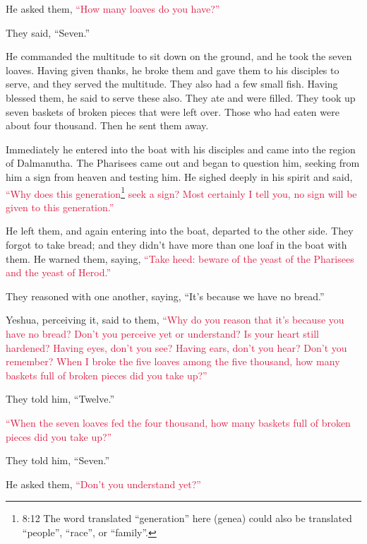 \myverse{}He asked them,
\textcolor{crimson}{“How many loaves do you have?”}

They said, “Seven.”

\myverse{}He commanded the multitude to sit down on the ground, and he took
the seven loaves. Having given thanks, he broke them and gave them to his disciples to serve, and they
served the multitude.
\myverse{}They also had a few small fish. Having blessed them, he said to serve these
also.
\myverse{}They ate and were filled. They took up seven baskets of broken pieces that were
left over.
\myverse{}Those who had eaten were about four thousand. Then he sent them away.

\myverse{}Immediately he entered into the boat with his disciples and came
into the region of Dalmanutha.
\myverse{}The Pharisees came out and began to question him, seeking from him a sign
from heaven and testing him.
\myverse{}He sighed deeply in his spirit and said,
\textcolor{crimson}{“Why does this generation}\footnote{8:12 The word translated “generation” here (genea) could also be translated “people”, “race”, or “family”.}
\textcolor{crimson}{seek a sign? Most certainly I tell you, no sign will be given to this generation.”}

\myverse{}He left them, and again entering into the boat, departed to the
other side.
\myverse{}They forgot to take bread; and they didn’t have more than one loaf in the
boat with them.
\myverse{}He warned them, saying,
\textcolor{crimson}{“Take heed: beware of the yeast of the Pharisees and the yeast of Herod.”}

\myverse{}They reasoned with one another, saying, “It’s because we have
no bread.”

\myverse{}Yeshua, perceiving it, said to them,
\textcolor{crimson}{“Why do you reason that it’s because you have no bread? Don’t you perceive yet or understand? Is your
	heart still hardened?
}
\myverse{}\textcolor{crimson}{Having eyes, don’t you see? Having ears, don’t you hear? Don’t you remember?
}
\myverse{}\textcolor{crimson}{When I broke the five loaves among the five thousand, how many baskets
	full of broken pieces did you take up?”}

They told him, “Twelve.”

\myverse{}\textcolor{crimson}{“When the seven loaves fed the four thousand, how many baskets
	full of broken pieces did you take up?”}

They told him, “Seven.”

\myverse{}He asked them,
\textcolor{crimson}{“Don’t you understand yet?”}

